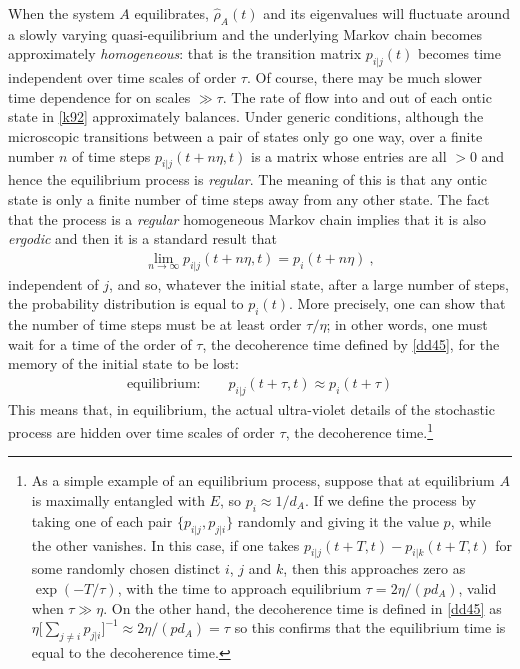 \documentclass[%
preprint,
nofootinbib,
 amsmath,amssymb,
aps,
]{revtex4-1}
\newcommand{\EQ}[1]{\begin{equation}\begin{split} #1
\end{split}\end{equation}}
\begin{document}
When the system $A$ equilibrates, $\hat\rho_A(t)$ and its eigenvalues will fluctuate around a slowly varying quasi-equilibrium and the underlying Markov chain becomes approximately {\it homogeneous\/}: that is the transition matrix $p_{i|j}(t)$ becomes time independent over time scales of order $\tau$. Of course, there may be much slower time dependence for on scales $\gg\tau$. 
The rate of flow into and out of each ontic state in \eqref{k92} approximately balances. 
Under generic conditions, although the microscopic transitions between a pair of states only go one way, over a finite number $n$ of time steps $p_{i|j}(t+n\eta,t)$ is a matrix whose entries are all $>0$ and hence the equilibrium process is {\it regular\/}. The meaning of this is that any ontic state is only a finite number of time steps away from any other state. The fact that the process is a {\it regular\/} homogeneous Markov chain implies that it is also {\it ergodic\/} and then it is a standard result that 
\EQ{
\lim_{n\to\infty}p_{i|j}(t+n\eta,t)=p_i(t+n\eta)\ ,
}
independent of $j$, and so, whatever the initial state, after a large number of steps, the probability distribution is equal to $p_i(t)$. More precisely, one can show that the number of time steps must be at least order $\tau/\eta$; in other words, one must wait for a time of the order of $\tau$, the decoherence time defined by \eqref{dd45}, for the memory of the initial state to be lost:
\EQ{
\boxed{\text{equilibrium:}\qquad p_{i|j}(t+\tau,t)\approx p_i(t+\tau)}
}
This means that, in equilibrium, the actual ultra-violet details of the stochastic process are hidden over time scales of order $\tau$, the decoherence time.\footnote{As a simple example of an equilibrium process, suppose that at equilibrium $A$ is maximally entangled with $E$, so $p_i\approx1/d_A$. If we define the process by taking one of each pair $\{p_{i|j},p_{j|i}\}$ randomly and giving it the value $p$, while the other vanishes. In this case, if one takes $p_{i|j}(t+T,t)-p_{i|k}(t+T,t)$ for some randomly chosen distinct $i$, $j$ and $k$, then this approaches zero as $\exp(-T/\tau)$, with the time to approach equilibrium $\tau=2\eta/(pd_A)$, valid when $\tau\gg\eta$. On the other hand, the decoherence time is defined in \eqref{dd45} as $\eta\big[\sum_{j\neq i}p_{j|i}\big]^{-1}\approx 2\eta/(pd_A)=\tau$  so this confirms that the equilibrium time is equal to the decoherence time.}
\end{document}
